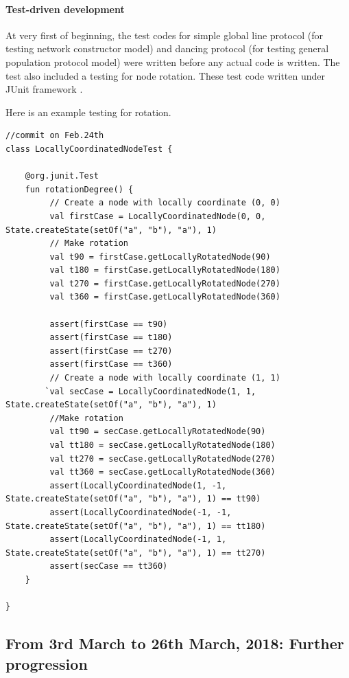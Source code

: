\paragraph{Test-driven development}
At very first of beginning, the test codes for simple global line protocol (for testing network constructor model)
and dancing protocol (for testing general population protocol model) were written before any actual code is written. The test also included
a testing for node rotation. These test code written under JUnit framework \cite{JUnit}.

\par\noindent
Here is an example testing for rotation.
\begin{lstlisting}[caption = {Testing for rotation}, style = mykotlin]
//commit on Feb.24th
class LocallyCoordinatedNodeTest {

    @org.junit.Test
    fun rotationDegree() {
         // Create a node with locally coordinate (0, 0)
         val firstCase = LocallyCoordinatedNode(0, 0, State.createState(setOf("a", "b"), "a"), 1)
         // Make rotation
         val t90 = firstCase.getLocallyRotatedNode(90)
         val t180 = firstCase.getLocallyRotatedNode(180)
         val t270 = firstCase.getLocallyRotatedNode(270)
         val t360 = firstCase.getLocallyRotatedNode(360)

         assert(firstCase == t90)
         assert(firstCase == t180)
         assert(firstCase == t270)
         assert(firstCase == t360)
         // Create a node with locally coordinate (1, 1)
        `val secCase = LocallyCoordinatedNode(1, 1, State.createState(setOf("a", "b"), "a"), 1)
         //Make rotation
         val tt90 = secCase.getLocallyRotatedNode(90)
         val tt180 = secCase.getLocallyRotatedNode(180)
         val tt270 = secCase.getLocallyRotatedNode(270)
         val tt360 = secCase.getLocallyRotatedNode(360)
         assert(LocallyCoordinatedNode(1, -1, State.createState(setOf("a", "b"), "a"), 1) == tt90)
         assert(LocallyCoordinatedNode(-1, -1, State.createState(setOf("a", "b"), "a"), 1) == tt180)
         assert(LocallyCoordinatedNode(-1, 1, State.createState(setOf("a", "b"), "a"), 1) == tt270)
         assert(secCase == tt360)
    }

}
\end{lstlisting}

\subsection{From 3rd March to 26th March, 2018: Further progression}
